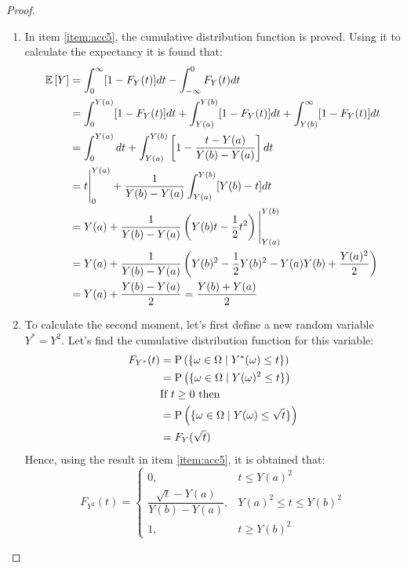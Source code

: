 \documentclass[11pt]{article}
\theoremstyle{definition}
\theoremstyle{remark}
\theoremstyle{remark}
\begin{document}
\begin{proof}
\begin{enumerate}[label=\alph*)]
    \item In item \ref{item:acc5}, the cumulative distribution function is
      proved. Using it to calculate the expectancy it is found that:
      \begin{align*}
        \E{Y} &= \int_0^\infty [1 - F_Y(t)] dt -
                \int_{-\infty}^0 F_Y(t) dt \\
              &= \int_0^{Y(a)}[1 - F_Y (t)] dt + \int_{Y(a)}^{Y(b)} [1 - F_Y(t)] dt
                + \int_{Y(b)}^\infty [1 - F_Y(t)]dt \\
              &= \int_0^{Y(a)}dt +
                \int_{Y(a)}^{Y(b)} \left[1 - \frac{t - Y(a)}{Y(b) - Y(a)}\right]dt \\
              &= t \Bigg\rvert_0^{Y(a)} + \frac{1}{Y(b) - Y(a)} \int_{Y(a)}^{Y(b)}  [Y(b) - t] dt \\
              &= Y(a) + \frac{1}{Y(b)-Y(a)} \left(Y(b)t - \frac{1}{2}t^2\right)
                \Bigg\rvert_{Y(a)}^{Y(b)} \\
              &= Y(a) + \frac{1}{Y(b)-Y(a)} \left(Y(b)^2 - \frac{1}{2}Y(b)^2 -
                Y(a)Y(b) + \frac{Y(a)^2}{2}\right) \\
              &= Y(a) + \frac{Y(b) - Y(a)}{2} = \frac{Y(b) + Y(a)}{2}
      \end{align*}

    \item To calculate the second moment, let's first define a new
      random variable $Y^* = Y^2$. Let's find the cumulative
      distribution function for this variable:
      \begin{align*}
        F_{Y^*}(t) &= \P{\{\omega \in \Omega \mid Y^*(\omega) \le t\}} \\
                   &= \P{\{\omega \in \Omega \mid Y(\omega)^2 \le t\}} \\
                   &\text{If } t \ge 0 \text{ then} \\
                   &=\P{\{\omega \in \Omega \mid Y(\omega) \le \sqrt{t}\}} \\
                   &= F_Y(\sqrt{t})
      \end{align*}
      Hence, using the result in item \ref{item:acc5}, it is obtained
      that:
      \begin{equation*}
        F_{Y^2}(t) =
        \begin{cases}
          0, &t \le Y(a)^2 \\
          \dfrac{\sqrt{t} - Y(a)}{Y(b) - Y(a)}, &Y(a)^2 \le t \le Y(b)^2 \\
          1, &t \ge Y(b)^2
        \end{cases}
      \end{equation*}


\end{enumerate}
\end{proof}
\end{document}
